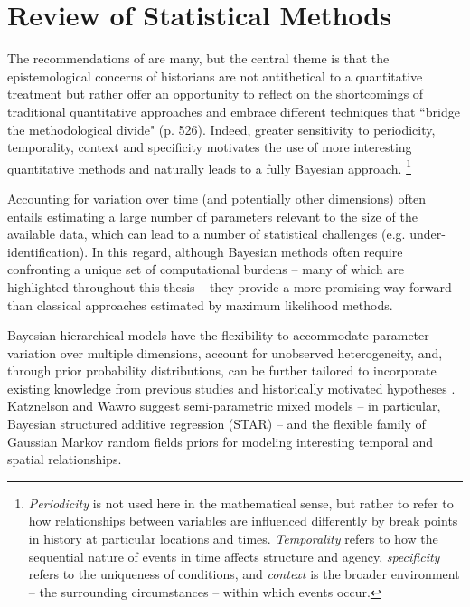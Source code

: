 
\chapter{Review of Statistical Methods}
\label{lit_review}



The recommendations of  are many, but the central 
theme is that the epistemological concerns of historians are not antithetical to a 
quantitative treatment but rather offer an opportunity to reflect on the shortcomings 
of traditional quantitative approaches and embrace different techniques that ``bridge 
the methodological divide" (p. 526). Indeed, greater sensitivity to periodicity, temporality, 
context and specificity motivates the use of more interesting quantitative methods and 
naturally leads to a fully Bayesian approach.%
\footnote{ 
{\it Periodicity} is not used here in the mathematical sense, but rather to refer to how relationships 
between variables are influenced differently by break points in history at particular locations and times. 
{\it Temporality} refers to how the sequential nature of events in time affects structure and agency, 
{\it specificity} refers to the uniqueness of conditions, and
{\it context} is the broader environment -- the surrounding circumstances -- within which events occur.
} %

Accounting for variation over time (and potentially other dimensions) often entails estimating 
a large number of parameters relevant to the size of the available data, which can lead 
to a number of statistical challenges (e.g. under-identification). In this regard, although Bayesian 
methods often require confronting a unique set of computational burdens -- many of which are 
highlighted throughout this thesis -- they provide a more promising way forward than 
classical approaches estimated by maximum likelihood methods. 

Bayesian hierarchical models have the flexibility to accommodate parameter 
variation over multiple dimensions, account for unobserved heterogeneity, and, 
through prior probability distributions, can be further tailored to incorporate existing 
knowledge from previous studies and historically motivated hypotheses 
\cite{wawro_designing_2014, goodrich_designing_2012}. 
Katznelson and Wawro suggest semi-parametric mixed models -- in particular,  Bayesian 
structured additive regression (STAR) -- and the flexible family of Gaussian Markov 
random fields priors for modeling interesting temporal and spatial relationships. 

